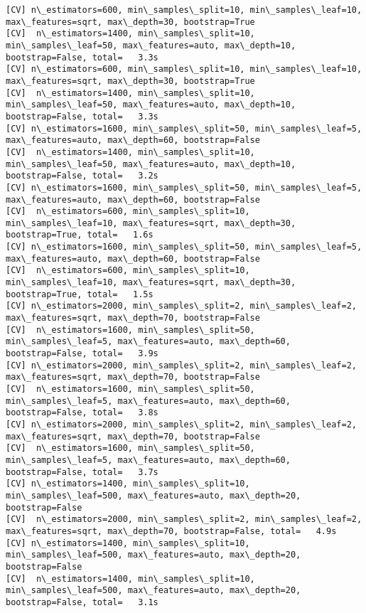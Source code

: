 \documentclass[11pt]{article}
\begin{document}
\begin{Verbatim}[commandchars=\\\{\}]
[CV] n\_estimators=600, min\_samples\_split=10, min\_samples\_leaf=10, max\_features=sqrt, max\_depth=30, bootstrap=True 
[CV]  n\_estimators=1400, min\_samples\_split=10, min\_samples\_leaf=50, max\_features=auto, max\_depth=10, bootstrap=False, total=   3.3s
[CV] n\_estimators=600, min\_samples\_split=10, min\_samples\_leaf=10, max\_features=sqrt, max\_depth=30, bootstrap=True 
[CV]  n\_estimators=1400, min\_samples\_split=10, min\_samples\_leaf=50, max\_features=auto, max\_depth=10, bootstrap=False, total=   3.3s
[CV] n\_estimators=1600, min\_samples\_split=50, min\_samples\_leaf=5, max\_features=auto, max\_depth=60, bootstrap=False 
[CV]  n\_estimators=1400, min\_samples\_split=10, min\_samples\_leaf=50, max\_features=auto, max\_depth=10, bootstrap=False, total=   3.2s
[CV] n\_estimators=1600, min\_samples\_split=50, min\_samples\_leaf=5, max\_features=auto, max\_depth=60, bootstrap=False 
[CV]  n\_estimators=600, min\_samples\_split=10, min\_samples\_leaf=10, max\_features=sqrt, max\_depth=30, bootstrap=True, total=   1.6s
[CV] n\_estimators=1600, min\_samples\_split=50, min\_samples\_leaf=5, max\_features=auto, max\_depth=60, bootstrap=False 
[CV]  n\_estimators=600, min\_samples\_split=10, min\_samples\_leaf=10, max\_features=sqrt, max\_depth=30, bootstrap=True, total=   1.5s
[CV] n\_estimators=2000, min\_samples\_split=2, min\_samples\_leaf=2, max\_features=sqrt, max\_depth=70, bootstrap=False 
[CV]  n\_estimators=1600, min\_samples\_split=50, min\_samples\_leaf=5, max\_features=auto, max\_depth=60, bootstrap=False, total=   3.9s
[CV] n\_estimators=2000, min\_samples\_split=2, min\_samples\_leaf=2, max\_features=sqrt, max\_depth=70, bootstrap=False 
[CV]  n\_estimators=1600, min\_samples\_split=50, min\_samples\_leaf=5, max\_features=auto, max\_depth=60, bootstrap=False, total=   3.8s
[CV] n\_estimators=2000, min\_samples\_split=2, min\_samples\_leaf=2, max\_features=sqrt, max\_depth=70, bootstrap=False 
[CV]  n\_estimators=1600, min\_samples\_split=50, min\_samples\_leaf=5, max\_features=auto, max\_depth=60, bootstrap=False, total=   3.7s
[CV] n\_estimators=1400, min\_samples\_split=10, min\_samples\_leaf=500, max\_features=auto, max\_depth=20, bootstrap=False 
[CV]  n\_estimators=2000, min\_samples\_split=2, min\_samples\_leaf=2, max\_features=sqrt, max\_depth=70, bootstrap=False, total=   4.9s
[CV] n\_estimators=1400, min\_samples\_split=10, min\_samples\_leaf=500, max\_features=auto, max\_depth=20, bootstrap=False 
[CV]  n\_estimators=1400, min\_samples\_split=10, min\_samples\_leaf=500, max\_features=auto, max\_depth=20, bootstrap=False, total=   3.1s

\end{Verbatim}
\end{document}
